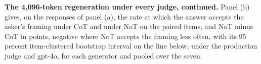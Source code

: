 \begin{table}[p]
\label{tab-app-rep4k}

\end{table}

\begin{table}[p]
\centering
\small
\addtocounter{table}{-1}%
\renewcommand{\theHtable}{\thetable.b}%
\caption{\textbf{The 4,096-token regeneration under every judge, continued.}
Panel (b) gives, on the responses of panel (a), the rate at which the answer
accepts the asker's framing under CoT and under NoT on the paired items, and
NoT minus CoT in points, negative where NoT accepts the framing less often,
with its 95 percent item-clustered bootstrap interval on the line below,
under the production judge and gpt-4o, for each generator and pooled over
the seven.}

\end{table}

